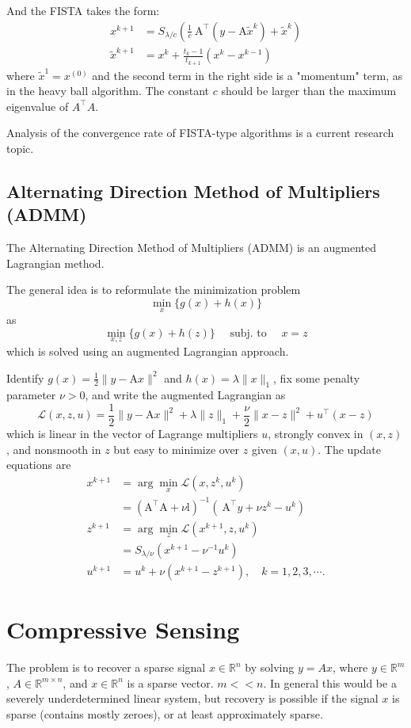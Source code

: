 \documentclass[11pt]{elegantbook}
\begin{document}
And the FISTA takes the form:
$$
\begin{aligned}
x^{k+1} &=S_{\lambda / c}\left(\frac{1}{c} \mathrm{~A}^{\top}\left(y-\mathrm{A} \tilde{x}^k\right)+\tilde{x}^k\right) \\
\tilde{x}^{k+1} &=x^k+\frac{t_k-1}{t_{k+1}}\left(x^k-x^{k-1}\right)
\end{aligned}
$$
where $\tilde{x}^1=x^{(0)}$ and the second term in the right side is a "momentum" term, as in the heavy ball algorithm. The constant $c$ should be larger than the maximum eigenvalue of $A^{\top} A$.

Analysis of the convergence rate of FISTA-type algorithms is a current research topic.

\section{Alternating Direction Method of Multipliers (ADMM)}
The Alternating Direction Method of Multipliers (ADMM) is an augmented Lagrangian method.

The general idea is to reformulate the minimization problem
$$
\min _x\{g(x)+h(x)\}
$$
as
$$
\min _{x, z}\{g(x)+h(z)\} \quad \text { subj. to } \quad x=z
$$
which is solved using an augmented Lagrangian approach.

Identify $g(x)=\frac{1}{2}\|y-\mathrm{A} x\|^2$ and $h(x)=\lambda\|x\|_1$, fix some penalty parameter $\nu>0$, and write the augmented Lagrangian as
$$
\mathcal{L}(x, z, u)=\frac{1}{2}\|y-\mathrm{A} x\|^2+\lambda\|z\|_1+\frac{\nu}{2}\|x-z\|^2+u^{\top}(x-z)
$$
which is linear in the vector of Lagrange multipliers $u$, strongly convex in $(x, z)$, and nonsmooth in $z$ but easy to minimize over $z$ given $(x, u)$. The update equations are
$$
\begin{aligned}
x^{k+1} &=\arg \min _x \mathcal{L}\left(x, z^k, u^k\right) \\
&=\left(\mathrm{A}^{\top} \mathrm{A}+\nu \mathrm{l}\right)^{-1}\left(\mathrm{~A}^{\top} y+\nu z^k-u^k\right) \\
z^{k+1} &=\arg \min _z \mathcal{L}\left(x^{k+1}, z, u^k\right) \\
&=S_{\lambda / \nu}\left(x^{k+1}-\nu^{-1} u^k\right) \\
u^{k+1} &=u^k+\nu\left(x^{k+1}-z^{k+1}\right), \quad k=1,2,3, \cdots .
\end{aligned}
$$

\chapter{Compressive Sensing}
The problem is to recover a sparse signal $x\in \mathbb{R}^n$ by solving $y=Ax$, where $y\in \mathbb{R}^m$, $A\in \mathbb{R}^{m\times n}$, and $x\in \mathbb{R}^n$ is a sparse vector. $m<<n$. In general this would be a severely underdetermined linear system, but recovery is possible if the signal $x$ is sparse (contains mostly zeroes), or at least approximately sparse.
\end{document}
